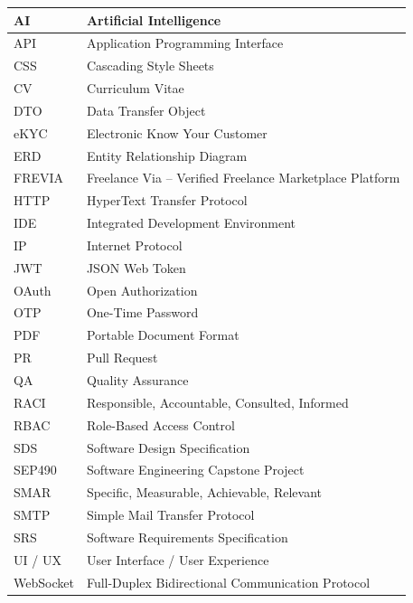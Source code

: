 \begin{longtable}{|L{3.5cm}|L{11.5cm}|}
AI & Artificial Intelligence \\ \hline
API & Application Programming Interface \\ \hline
CSS & Cascading Style Sheets \\ \hline
CV & Curriculum Vitae \\ \hline
DTO & Data Transfer Object \\ \hline
eKYC & Electronic Know Your Customer \\ \hline
ERD & Entity Relationship Diagram \\ \hline
FREVIA & Freelance Via -- Verified Freelance Marketplace Platform \\ \hline
HTTP & HyperText Transfer Protocol \\ \hline
IDE & Integrated Development Environment \\ \hline
IP & Internet Protocol \\ \hline
JWT & JSON Web Token \\ \hline
OAuth & Open Authorization \\ \hline
OTP & One-Time Password \\ \hline
PDF & Portable Document Format \\ \hline
PR & Pull Request \\ \hline
QA & Quality Assurance \\ \hline
RACI & Responsible, Accountable, Consulted, Informed \\ \hline
RBAC & Role-Based Access Control \\ \hline
SDS & Software Design Specification \\ \hline
SEP490 & Software Engineering Capstone Project \\ \hline
SMAR & Specific, Measurable, Achievable, Relevant \\ \hline
SMTP & Simple Mail Transfer Protocol \\ \hline
SRS & Software Requirements Specification \\ \hline
UI / UX & User Interface / User Experience \\ \hline
WebSocket & Full-Duplex Bidirectional Communication Protocol \\ \hline
\end{longtable}
\endgroup

\renewcommand{\theHtable}{\arabic{table}}
\setcounter{table}{0}

\newpage
